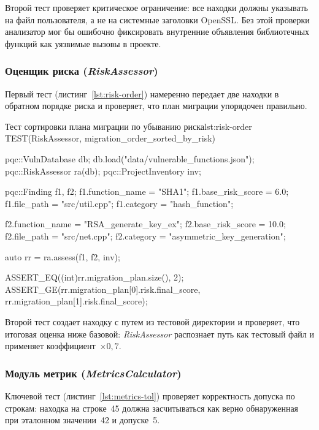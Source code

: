 \documentclass{itmo-vkr}
\newcommand{\code}[1]{\textit{#1}}
\begin{document}
Второй тест проверяет критическое ограничение: все находки должны
указывать на файл пользователя, а не на системные заголовки OpenSSL.
Без этой проверки анализатор мог бы ошибочно фиксировать внутренние
объявления библиотечных функций как уязвимые вызовы в проекте.

\subsubsection{Оценщик риска (\code{RiskAssessor})}

Первый тест (листинг~\ref{lst:risk-order}) намеренно передает
две находки в обратном порядке риска и проверяет, что план миграции
упорядочен правильно.

\begin{itmolisting}[C++]{Тест сортировки плана миграции по убыванию риска}{lst:risk-order}
TEST(RiskAssessor, migration_order_sorted_by_risk) {
    pqc::VulnDatabase db;
    db.load("data/vulnerable_functions.json");
    pqc::RiskAssessor ra(db);
    pqc::ProjectInventory inv;

    pqc::Finding f1, f2;
    f1.function_name = "SHA1";
    f1.base_risk_score = 6.0; f1.file_path = "src/util.cpp";
    f1.category = "hash_function";

    f2.function_name = "RSA_generate_key_ex";
    f2.base_risk_score = 10.0; f2.file_path = "src/net.cpp";
    f2.category = "asymmetric_key_generation";

    auto rr = ra.assess({f1, f2}, inv);

    ASSERT_EQ((int)rr.migration_plan.size(), 2);
    ASSERT_GE(rr.migration_plan[0].risk.final_score,
              rr.migration_plan[1].risk.final_score);
}
\end{itmolisting}

Второй тест создает находку с путем из тестовой директории
и проверяет, что итоговая оценка ниже базовой: \code{RiskAssessor}
распознает путь как тестовый файл и применяет коэффициент~$\times0{,}7$.

\subsubsection{Модуль метрик (\code{MetricsCalculator})}

Ключевой тест (листинг~\ref{lst:metrics-tol})
проверяет корректность допуска по строкам: находка на строке~45 должна
засчитываться как верно обнаруженная при эталонном значении~42 и допуске~5.
\end{document}
